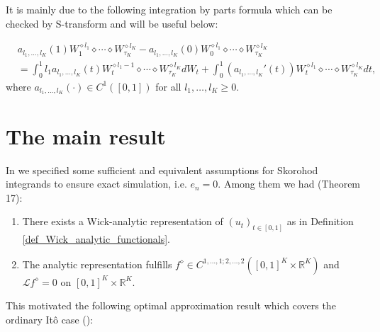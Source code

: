 \documentclass[a4paper,11pt,reqno]{amsart}
\theoremstyle{plain}
\def\R{\mathbb{R}}
\numberwithin{equation}{section}
\begin{document}
It is mainly due to the following integration by parts formula which can be checked by S-transform and will be useful below:

\begin{align}
&a_{l_1, \ldots, l_K}(1) W_1^{\diamond l_1} \diamond \cdots \diamond W_{\tau_K}^{\diamond l_K} - a_{l_1, \ldots, l_K}(0) W_0^{\diamond l_1} \diamond \cdots \diamond W_{\tau_K}^{\diamond l_K}\nonumber\\
&= \int_{0}^{1} l_1a_{l_1, \ldots, l_K}(t) W_{t}^{\diamond l_1-1} \diamond \cdots \diamond W_{\tau_K}^{\diamond l_K} dW_{t}  + \int_{0}^{1} \left( a_{l_1, \ldots, l_K}'(t)\right) W_{t}^{\diamond l_1} \diamond \cdots \diamond W_{\tau_K}^{\diamond l_K} dt,\label{eq:IBPWick}
\end{align}
where $a_{l_1, \ldots, l_K}(\cdot)\in C^1([0,1])$ for all $l_1, \ldots, l_K \geq 0$.

\section{The main result}\label{section_2}

In \cite{NP} we specified some sufficient and equivalent assumptions for Skorohod integrands to ensure exact simulation, i.e. $e_n=0$. Among them we had (Theorem 17):
\begin{enumerate}
 \item There exists a Wick-analytic representation of $(u_t)_{t \in [0,1]}$ as in Definition \ref{def_Wick_analytic_functionals}.
\item The analytic representation fulfills $f^{\diamond} \in C^{1,\ldots, 1; 2,\ldots, 2}([0,1]^K\times \R^{K})$ and $\mathcal{L} f^{\diamond} =0$ on $[0,1]^K \times \R^{K}$.
\end{enumerate}

This motivated the following optimal approximation result which covers the ordinary It\^o case (\cite[Theorem 21]{NP}):
\end{document}
